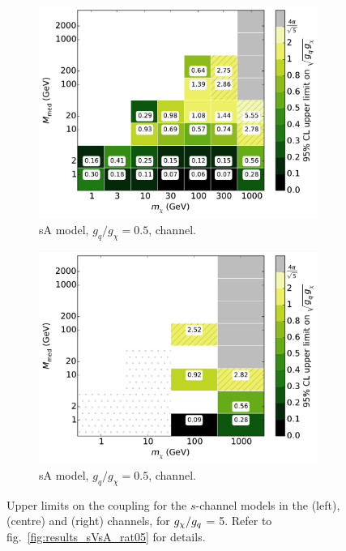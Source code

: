 \begin{figure}
\begin{subfigure}[t]{0.32\textwidth}
    \includegraphics[width=1.\textwidth]{figures/grid_allpoints_SAD_rat5.pdf}
    \caption{sA model, $g_q/g_{\chi} = 0.5$, \monoZ channel.}
  \end{subfigure}
  \begin{subfigure}[t]{0.32\textwidth}
    \centering
    \includegraphics[width=1.\textwidth]{figures/grid_basepoints_SAD_rat5_monoWZ.pdf}
    \caption{sA model, $g_q/g_{\chi} = 0.5$, \monoWZ channel.}
  \end{subfigure}
  \caption{Upper limits on the coupling for the $s$-channel models in the \monojet (left), \monoZ (centre) and \monoWZ (right) channels, for $g_{\chi} / g_q$ = 5. Refer to fig.~\ref{fig:results_sVsA_rat05} for details.}
  \label{fig:results_sVsA_rat5}
\end{figure}

